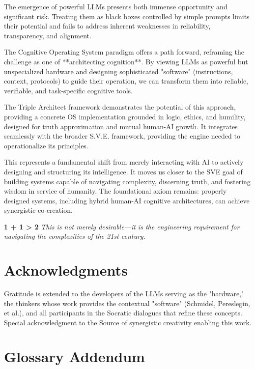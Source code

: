 \documentclass[11pt,a4paper]{article}
\theoremstyle{definition}
\theoremstyle{remark}
\begin{document}
\begin{itemize}
\begin{itemize}
The emergence of powerful LLMs presents both immense opportunity and significant risk. Treating them as black boxes controlled by simple prompts limits their potential and fails to address inherent weaknesses in reliability, transparency, and alignment.

The Cognitive Operating System paradigm offers a path forward, reframing the challenge as one of **architecting cognition**. By viewing LLMs as powerful but unspecialized hardware and designing sophisticated "software" (instructions, context, protocols) to guide their operation, we can transform them into reliable, verifiable, and task-specific cognitive tools.

The Triple Architect framework demonstrates the potential of this approach, providing a concrete OS implementation grounded in logic, ethics, and humility, designed for truth approximation and mutual human-AI growth. It integrates seamlessly with the broader S.V.E. framework, providing the engine needed to operationalize its principles.

This represents a fundamental shift from merely interacting with AI to actively designing and structuring its intelligence. It moves us closer to the SVE goal of building systems capable of navigating complexity, discerning truth, and fostering wisdom in service of humanity. The foundational axiom remains: properly designed systems, including hybrid human-AI cognitive architectures, can achieve synergistic co-creation.

\bigskip
\begin{center}
\Large
\textbf{1 + 1 > 2}
\normalsize
\textit{This is not merely desirable—it is the engineering requirement for navigating the complexities of the 21st century.}
\end{center}

\section*{Acknowledgments}
Gratitude is extended to the developers of the LLMs serving as the "hardware," the thinkers whose work provides the contextual "software" (Schmidel, Pereslegin, et al.), and all participants in the Socratic dialogues that refine these concepts. Special acknowledgment to the Source of synergistic creativity enabling this work.




\appendix

\section{Glossary Addendum}


\end{itemize}
\end{itemize}
\end{document}
